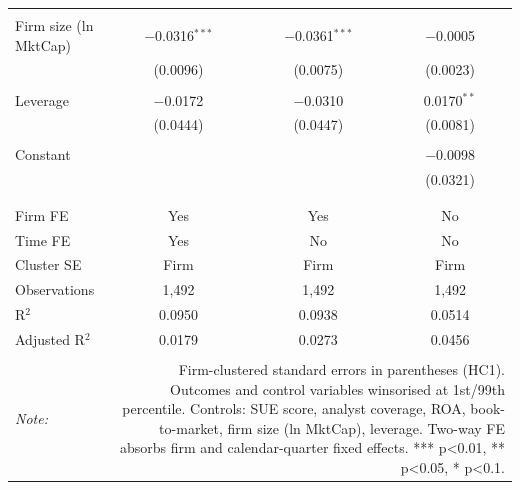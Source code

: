 \begin{table}[!htbp]
\begin{tabular}{@{\extracolsep{5pt}}lccc}
  & & & \\ 
 Firm size (ln MktCap) & $-$0.0316$^{***}$ & $-$0.0361$^{***}$ & $-$0.0005 \\ 
  & (0.0096) & (0.0075) & (0.0023) \\ 
  & & & \\ 
 Leverage & $-$0.0172 & $-$0.0310 & 0.0170$^{**}$ \\ 
  & (0.0444) & (0.0447) & (0.0081) \\ 
  & & & \\ 
 Constant &  &  & $-$0.0098 \\ 
  &  &  & (0.0321) \\ 
  & & & \\ 
\hline \\[-1.8ex] 
Firm FE & Yes & Yes & No \\ 
Time FE & Yes & No & No \\ 
Cluster SE & Firm & Firm & Firm \\ 
Observations & 1,492 & 1,492 & 1,492 \\ 
R$^{2}$ & 0.0950 & 0.0938 & 0.0514 \\ 
Adjusted R$^{2}$ & 0.0179 & 0.0273 & 0.0456 \\ 
\hline 
\hline \\[-1.8ex] 
\textit{Note:}  & \multicolumn{3}{r}{Firm-clustered standard errors in parentheses (HC1). Outcomes and control variables winsorised at 1st/99th percentile. Controls: SUE score, analyst coverage, ROA, book-to-market, firm size (ln MktCap), leverage. Two-way FE absorbs firm and calendar-quarter fixed effects. *** p<0.01, ** p<0.05, * p<0.1.} \\ 
\end{tabular} 
\end{table} 
